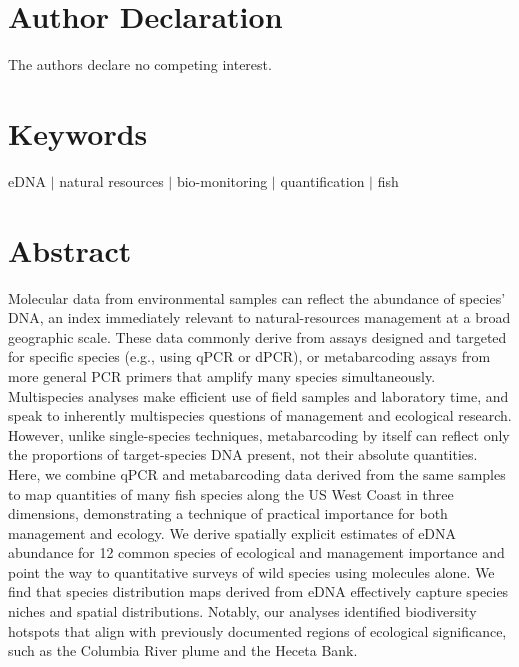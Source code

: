 \documentclass{article}
\begin{document}
\section*{Author Declaration}
The authors declare no competing interest.

\section*{Keywords}
eDNA $|$ natural resources $|$ bio-monitoring $|$ quantification $|$ fish

\section*{Abstract}
Molecular data from environmental samples can reflect the abundance of species’ DNA, an index immediately relevant to natural-resources management at a broad geographic scale. These data commonly derive from assays designed and targeted for specific species (e.g., using qPCR or dPCR), or metabarcoding assays from more general PCR primers that amplify many species simultaneously. Multispecies analyses make efficient use of field samples and laboratory time, and speak to inherently multispecies questions of management and ecological research. However, unlike single-species techniques, metabarcoding by itself can reflect only the proportions of target-species DNA present, not their absolute quantities. Here, we combine qPCR and metabarcoding data derived from the same samples to map quantities of many fish species along the US West Coast in three dimensions, demonstrating a technique of practical importance for both management and ecology. We derive spatially explicit estimates of eDNA abundance for 12 common species of ecological and management importance and point the way to quantitative surveys of wild species using molecules alone. We find that species distribution maps derived from eDNA effectively capture species niches and spatial distributions. Notably, our analyses identified biodiversity hotspots that align with previously documented regions of ecological significance, such as the Columbia River plume and the Heceta Bank.
\end{document}
